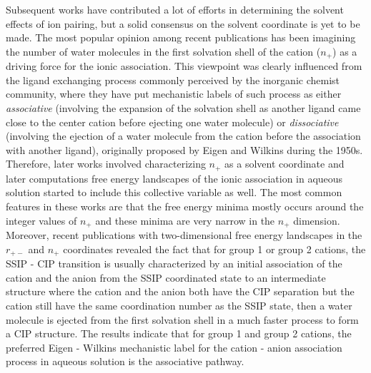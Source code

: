 \begin{spacing}{2.0}
    Subsequent works have contributed a lot of efforts in determining the solvent effects of ion pairing, but a solid consensus on the solvent 
    coordinate is yet to be made. The most popular opinion among recent publications has been imagining the number of water molecules in the first 
    solvation shell of the cation ($n_+$) as a driving force for the ionic association. This viewpoint was clearly influenced from the ligand 
    exchanging process commonly perceived by the inorganic chemist community, where they have put mechanistic labels of such process as either
    \textsl{associative} (involving the expansion of the solvation shell as another ligand came close to the center cation before ejecting one 
    water molecule) or \textsl{dissociative} (involving the ejection of a water molecule from the cation before the association with another 
    ligand), originally proposed by Eigen and Wilkins during the 1950s. \cite{P-ChemRev-2005-v105-Richens, P-PureApplChem-1963-v6-Eigen, IB-EigenWilkins-1965}
    Therefore, later works involved characterizing $n_+$ as a solvent coordinate and later computations free energy landscapes of the ionic 
    association in aqueous solution started to include this collective variable as well.
    \cite{P-JChemPhys-2007-v127-Ikeda, P-JPhysChemC-2015-v43-Raiteri, P-JPhysChemC-2016-v120-Roy, P-JCTC-2017-v13-Roy} The most common features 
    in these works are that the free energy minima mostly occurs around the integer values of $n_+$ and these minima are very narrow in the $n_+$
    dimension. Moreover, recent publications with two-dimensional free energy landscapes in the $r_{+-}$ and $n_+$ coordinates revealed the fact 
    that for group 1 or group 2 cations, the SSIP - CIP transition is usually characterized by an initial association of the cation and the anion 
    from the SSIP coordinated state to an intermediate structure where the cation and the anion both have the CIP separation but the cation still 
    have the same coordination number as the SSIP state, then a water molecule is ejected from the first solvation shell in a much faster process 
    to form a CIP structure. The results indicate that for group 1 and group 2 cations, the preferred Eigen - Wilkins mechanistic label for the 
    cation - anion association process in aqueous solution is the associative pathway.


\end{spacing}
